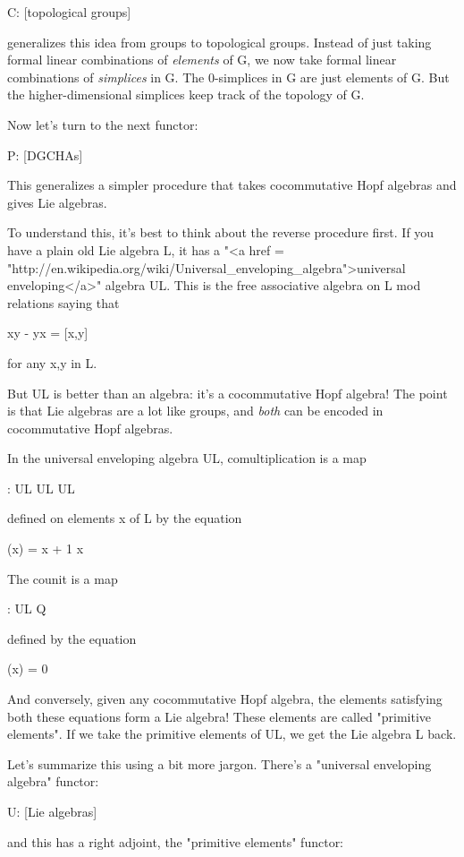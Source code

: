 C: [topological groups] \to  [DGCHAs]

generalizes this idea from groups to topological groups.  Instead of
just taking formal linear combinations of \emph{elements} of G, we
now take formal linear combinations of \emph{simplices} in G.  The
0-simplices in G are just elements of G.  But the higher-dimensional
simplices keep track of the topology of G.

Now let's turn to the next functor:

P: [DGCHAs] \to  [DGLAs]

This generalizes a simpler procedure that takes cocommutative Hopf
algebras and gives Lie algebras.

To understand this, it's best to think about the reverse procedure
first.  If you have a plain old Lie algebra L, it has a "<a href
=
"http://en.wikipedia.org/wiki/Universal_enveloping_algebra">universal
enveloping</a>" algebra UL.  This is the free associative algebra
on L mod relations saying that

xy - yx = [x,y]

for any x,y in L.

But UL is better than an algebra: it's a cocommutative Hopf algebra!
The point is that Lie algebras are a lot like groups, and \emph{both}
can be encoded in cocommutative Hopf algebras.  

In the universal enveloping algebra UL, comultiplication is a map

\Delta : UL \to  UL \otimes  UL

defined on elements x of L by the equation

\Delta (x) = x  + 1 \otimes  x

The counit is a map

\epsilon : UL \to  Q

defined by the equation

\epsilon (x) = 0

And conversely, given any cocommutative Hopf algebra, the elements
satisfying both these equations form a Lie algebra!  These elements
are called "primitive elements".  If we take the primitive
elements of UL, we get the Lie algebra L back.

Let's summarize this using a bit more jargon.  There's a
"universal enveloping algebra" functor:

U: [Lie algebras] 

and this has a right adjoint, the "primitive elements"
functor:

